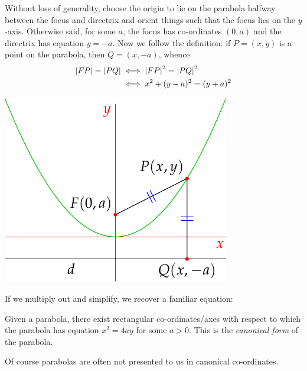 \begin{minipage}[t]{0.6\linewidth}\vspace{0pt}
Without loss of generality, choose the origin to lie on the parabola halfway between the focus and directrix and orient things such that the focus lies on the $y$-axis. Otherwise said, for some $a$, the focus has co-ordinates $(0,a)$ and the directrix has equation $y=-a$.\smallbreak
Now we follow the definition: if $P=(x,y)$ is a point on the parabola, then $Q=(x,-a)$, whence
  \begin{align*}
  \left| FP\right|=\left| PQ\right|&\iff \left| FP\right|^2=\left| PQ\right|^2\\
  &\iff x^2+(y-a)^2=(y+a)^2
  \end{align*}
\end{minipage}\begin{minipage}[t]{0.4\linewidth}\vspace{0pt}
\flushright\includegraphics{parabola4}
\end{minipage}


If we multiply out and simplify, we recover a familiar equation:

\begin{thm}{}{}
Given a parabola, there exist rectangular co-ordinates/axes with respect to which the parabola has equation $x^2=4ay$ for some $a>0$. This is the \emph{canonical form} of the parabola.
\end{thm}

Of course parabolas are often not presented to us in canonical co-ordinates.

